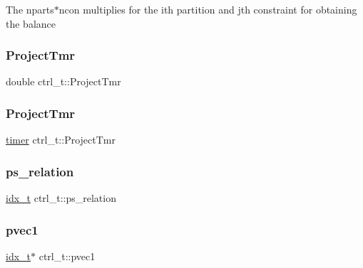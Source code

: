 The nparts$\ast$ncon multiplies for the ith partition and jth constraint for obtaining the balance \mbox{\label{a00742_a5261c7a1d0f02a8d39885ed88c34cfe6}} 
\subsubsection{\texorpdfstring{Project\+Tmr}{ProjectTmr}\hspace{0.1cm}{\footnotesize\ttfamily [1/2]}}
{\footnotesize\ttfamily double ctrl\+\_\+t\+::\+Project\+Tmr}

\mbox{\label{a00742_ad9d67bcaaeffa73907f8e8943e2ea2fc}} 
\subsubsection{\texorpdfstring{Project\+Tmr}{ProjectTmr}\hspace{0.1cm}{\footnotesize\ttfamily [2/2]}}
{\footnotesize\ttfamily \hyperlink{a00978_aae821c36bb7e6918e1414484f939c3d4}{timer} ctrl\+\_\+t\+::\+Project\+Tmr}

\mbox{\label{a00742_a0b93ba7aef798c08a0df00fca7b92c54}} 
\subsubsection{\texorpdfstring{ps\+\_\+relation}{ps\_relation}}
{\footnotesize\ttfamily \hyperlink{a00876_aaa5262be3e700770163401acb0150f52}{idx\+\_\+t} ctrl\+\_\+t\+::ps\+\_\+relation}

\mbox{\label{a00742_a98a13efbfba152fab96c7d0c87137fdb}} 
\subsubsection{\texorpdfstring{pvec1}{pvec1}}
{\footnotesize\ttfamily \hyperlink{a00876_aaa5262be3e700770163401acb0150f52}{idx\+\_\+t}$\ast$ ctrl\+\_\+t\+::pvec1}

